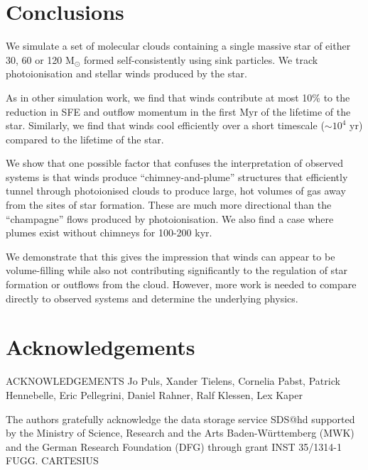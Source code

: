 \documentclass[a4paper,fleqn,usenatbib]{mnras}
\newcommand{\Msolar}{M$_{\odot}$\xspace}
\begin{document}
\section{Conclusions}
\label{conclusions}

We simulate a set of molecular clouds containing a single massive star of either 30, 60 or 120 \Msolar formed self-consistently using sink particles. We track photoionisation and stellar winds produced by the star.

As in other simulation work, we find that winds contribute at most 10\% to the reduction in SFE and outflow momentum in the first Myr of the lifetime of the star. Similarly, we find that winds cool efficiently over a short timescale ($\sim 10^4$ yr) compared to the lifetime of the star.

We show that one possible factor that confuses the interpretation of observed systems is that winds produce ``chimney-and-plume'' structures that efficiently tunnel through photoionised clouds to produce large, hot volumes of gas away from the sites of star formation. These are much more directional than the ``champagne'' flows produced by photoionisation. We also find a case where plumes exist without chimneys for 100-200 kyr. 

We demonstrate that this gives the impression that winds can appear to be volume-filling while also not contributing significantly to the regulation of star formation or outflows from the cloud. However, more work is needed to compare directly to observed systems and determine the underlying physics.

\section*{Acknowledgements}

ACKNOWLEDGEMENTS
Jo Puls, Xander Tielens, Cornelia Pabst, Patrick Hennebelle, Eric Pellegrini, Daniel Rahner, Ralf Klessen, Lex Kaper

The authors gratefully acknowledge the data storage service SDS@hd supported by the Ministry of Science, Research and the Arts Baden-W\"urttemberg (MWK) and the German Research Foundation (DFG) through grant INST 35/1314-1 FUGG.
CARTESIUS



\end{document}
